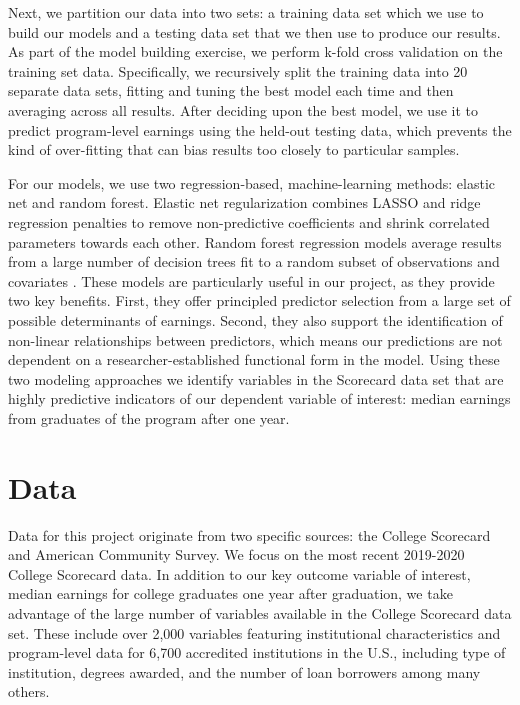 \documentclass[a4paper, 12pt]{article}
\begin{document}
Next, we partition our data into two sets: a training data set which we use to build our models and a testing data set that we then use to produce our results. As part of the model building exercise, we perform k-fold cross validation on the training set data. Specifically, we recursively split the training data into 20 separate data sets, fitting and tuning the best model each time and then averaging across all results. After deciding upon the best model, we use it to predict program-level earnings using the held-out testing data, which prevents the kind of over-fitting that can bias results too closely to particular samples.

For our models, we use two regression-based, machine-learning methods: elastic net and random forest. Elastic net regularization combines LASSO and ridge regression penalties to remove non-predictive coefficients and shrink correlated parameters towards each other. Random forest regression models average results from a large number of decision trees fit to a random subset of observations and covariates \parencite{Hastie_etal_2016}. These models are particularly useful in our project, as they provide two key benefits. First, they offer principled predictor selection from a large set of possible determinants of earnings. Second, they also support the identification of non-linear relationships between predictors, which means our predictions are not dependent on a researcher-established functional form in the model. Using these two modeling approaches we identify variables in the Scorecard data set that are highly predictive indicators of our dependent variable of interest: median earnings from graduates of the program after one year.


\section*{Data}

Data for this project originate from two specific sources: the College Scorecard and American Community Survey. We focus on the most recent 2019-2020 College Scorecard data. In addition to our key outcome variable of interest, median earnings for college graduates one year after graduation, we take advantage of the large number of variables available in the College Scorecard data set. These include over 2,000 variables featuring institutional characteristics and program-level data for 6,700 accredited institutions in the U.S., including type of institution, degrees awarded, and the number of loan borrowers among many others.
\end{document}
